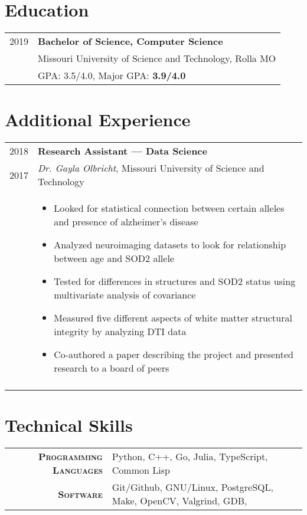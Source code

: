 \documentclass[a4paper,10pt]{article}
\newcommand{\br}{\\\multicolumn{2}{c}{}}
\begin{document}
\section{Education}
\begin{tabular}{r|p{15cm}}
  \textsc{2019} & \textbf{Bachelor of Science, Computer Science} \\
                & Missouri University of Science and Technology, Rolla MO  \\
                & GPA: 3.5/4.0, Major GPA: \textbf{3.9/4.0} \\
\end{tabular}

\section{Additional Experience}
\begin{tabular}{r|p{15cm}}
    \textsc{2018} & \textbf{Research Assistant --- Data Science} \\
    \textsc{2017} & \textit{Dr. Gayla Olbricht}, Missouri University of Science and Technology \\ &
    \begin{itemize}
    \item Looked for statistical connection between certain alleles and presence of alzheimer's disease
    \item Analyzed neuroimaging datasets to look for relationship between age and SOD2 allele
    \item Tested for differences in structures and SOD2 status using multivariate analysis of covariance
    \item Measured five different aspects of white matter structural integrity by analyzing DTI data
    \item Co-authored a paper describing the project and presented research to a board of peers
    \end{itemize} \br\\

\end{tabular}

\section{Technical Skills}
\begin{tabular}{r|p{15cm}}
    \textsc{\small \textbf {Programming Languages}} &
    Python,
    C++,
    Go,
    Julia,
    TypeScript,
    Common Lisp\\

    \textsc{\small \textbf {Software}} &
    Git/Github,
    GNU/Linux,
    PostgreSQL,
    Make,
    OpenCV,
    Valgrind,
    GDB,
\end{tabular}
\end{document}
